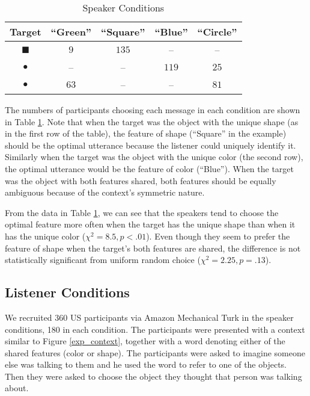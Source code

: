\begin{table}[htb]   
  \caption{Speaker Conditions}
  \centering
  \begin{tabular}{c|cccc}
   Target  & ``Green'' & ``Square'' & ``Blue'' & ``Circle'' \\ 
     \hline
\textcolor{green!65}{\Large{$\blacksquare$}}    & $9$        &   $135$   & -- & -- \\
\textcolor{blue!65}{\Huge{$\bullet$}}           & --        &   --      & $119$ & $25$\\
\textcolor{green!65}{\Huge{$\bullet$}}          & $63$        &   --    &  --   & $81$             
  \end{tabular}

  \label{table:speaker}
\end{table}

The numbers of participants choosing each message in each condition are shown in Table \ref{table:speaker}. Note that when the target was the object with the unique shape (as in the first row of the table), the feature of shape (``Square'' in the example) should be the optimal utterance because the listener could uniquely identify it. Similarly when the target was the object with the unique color (the second row), the optimal utterance would be the feature of color (``Blue''). When the target was the object with both features shared, both features should be equally ambiguous because of the context's symmetric nature.

From the data in Table \ref{table:speaker}, we can see that the speakers tend to choose the optimal feature more often when the target has the unique shape than when it has the unique color ($\chi^2=8.5, p<.01$). Even though they seem to prefer the feature of shape when the target's both features are shared, the difference is not statistically significant from uniform random choice ($\chi^2=2.25, p=.13$).


\subsection{Listener Conditions}

We recruited 360 US participants via Amazon Mechanical Turk in the speaker conditions, 180 in each condition. The participants were presented with a context similar to Figure \ref{exp_context}, together with a word denoting either of the shared features (color or shape). The participants were asked to imagine someone else was talking to them and he used the word to refer to one of the objects. Then they were asked to choose the object they thought that person was talking about.

